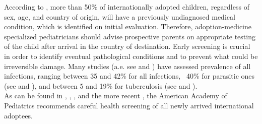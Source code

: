 According to \cite{medicalscreening}, more than 50\% of internationally adopted children, regardless of sex, age, and country of origin, will have a previously undiagnosed medical condition, which is identified on initial evaluation. Therefore, adoption-medicine specialized pediatricians should advise prospective parents on appropriate testing of the child after arrival in the country of destination. Early screening is crucial in order to identify eventual pathological conditions and to prevent what could be irreversible damage. Many studies (a.e. see \cite{notonlyinfectious} and \cite{obringer}) have assessed prevalence of all infections, ranging between 35 and 42\% for all infections, ~40\% for parasitic ones (see \cite{GNLBIexp} and \cite{sollai}), and between 5 and 19\% for tuberculosis (see \cite{sollai} and \cite{ampofo}).\\
As can be found in \cite{initialeval}, \cite{redbook}, \cite{GNLBIexp}, and the more recent \cite{comphealtheval}, the American Academy of Pediatrics recommends careful health screening of all newly arrived international adoptees.

